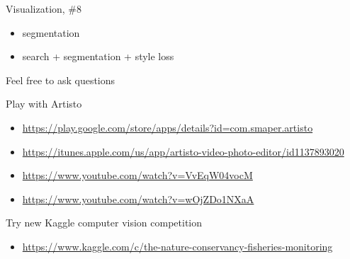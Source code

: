 \documentclass{beamer}
\begin{document}
\begin{frame}{Visualization, \#8}

\begin{itemize}
\item segmentation
\item search + segmentation  + style loss
\end{itemize}

\end{frame}


\begin{frame}{Feel free to ask questions}

Play with Artisto
\begin{itemize}
\item \url{https://play.google.com/store/apps/details?id=com.smaper.artisto}
\item \url{https://itunes.apple.com/us/app/artisto-video-photo-editor/id1137893020}
\item \url{https://www.youtube.com/watch?v=VvEqW04vocM}
\item \url{https://www.youtube.com/watch?v=wOjZDo1NXaA}
\end{itemize}

Try new Kaggle computer vision competition
\begin{itemize}
\item \url{https://www.kaggle.com/c/the-nature-conservancy-fisheries-monitoring}
\end{itemize}

\end{frame}

\end{document}
